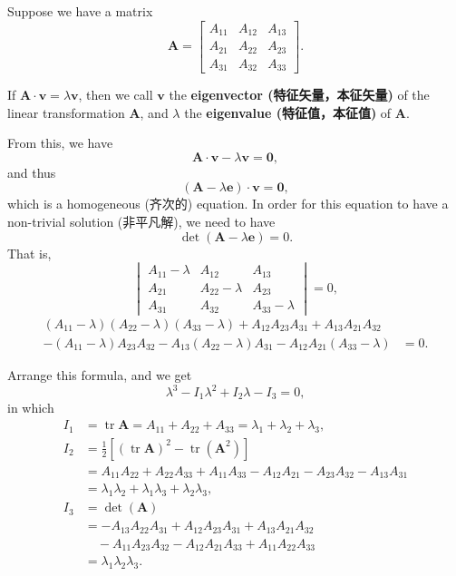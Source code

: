 Suppose we have a matrix \[\mathbf A = 
\begin{bmatrix}
    A_{11} & A_{12} &A_{13} \\
    A_{21} & A_{22} &A_{23} \\
    A_{31} & A_{32} &A_{33}
\end{bmatrix}.\]

If \(\mathbf A \cdot \boldsymbol v = \lambda \boldsymbol v\), then we
call \(\boldsymbol v\) the \textbf{eigenvector (特征矢量，本征矢量)} of
the linear transformation \(\mathbf A\), and \(\lambda\) the
\textbf{eigenvalue (特征值，本征值)} of \(\mathbf A\).

From this, we have
\[\mathbf A \cdot \boldsymbol v - \lambda \boldsymbol v = \boldsymbol 0,\]
and thus
\[(\mathbf A - \lambda \mathbf e) \cdot \boldsymbol v = \boldsymbol 0,\]
which is a homogeneous (齐次的) equation. In order for this equation to
have a non-trivial solution (非平凡解), we need to have
\[\det (\mathbf A - \lambda \mathbf e) = 0.\] That is, \[\begin{vmatrix}
    A_{11} - \lambda & A_{12} & A_{13} \\
    A_{21} & A_{22} - \lambda & A_{23} \\
    A_{31} & A_{32} & A_{33} - \lambda 
\end{vmatrix} = 0,\] \begin{align*}
    (A_{11} - \lambda)(A_{22} - \lambda)(A_{33} - \lambda) + A_{12}A_{23}A_{31} + A_{13}A_{21}A_{32} & \\
    - (A_{11} - \lambda)A_{23}A_{32} - A_{13}(A_{22} - \lambda)A_{31} - A_{12}A_{21}(A_{33} - \lambda) & = 0.
\end{align*}

Arrange this formula, and we get
\[\lambda ^3 - I_1 \lambda ^2 + I_2 \lambda - I_3 = 0,\] in which
\begin{align*}
    I_1 & = \operatorname{tr} \mathbf{A} = A_{11} + A_{22} + A_{33} = \lambda_1 + \lambda_2 + \lambda_3, \\
    I_2 & = \frac{1}{2} \left[ (\operatorname{tr} \mathbf{A})^2 - \operatorname{tr} \left( \mathbf{A}^2 \right) \right] \\
    & = A_{11} A_{22} + A_{22} A_{33} + A_{11} A_{33} - A_{12} A_{21} - A_{23} A_{32} - A_{13} A_{31} \\ & = \lambda_1 \lambda_2 + \lambda_1 \lambda_3 + \lambda_2 \lambda_3, \\
    I_3 & = \det (\mathbf{A}) \\ & = - A_{13} A_{22} A_{31} + A_{12} A_{23} A_{31} + A_{13} A_{21} A_{32} \\ & \quad - A_{11} A_{23} A_{32} - A_{12} A_{21} A_{33} +   A_{11} A_{22} A_{33} \\ & = \lambda_1 \lambda_2 \lambda_3.
\end{align*}

